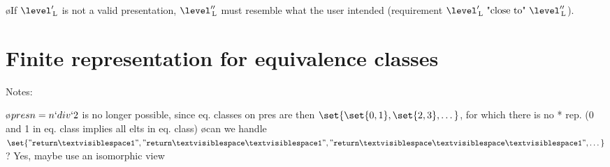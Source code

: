 %
%
%
%
%
%
%


\bl
\o If $\level'\L$ is not a valid presentation, $\level''\L$ must resemble what the user intended (requirement $\level'\L~\text{"close to"}~\level''\L$).
\el






%																
%																
%																
\section{Finite representation for equivalence classes} \label{sect:finiteRep}

Notes:

\bl
\o $pres n = n `div` 2$ is no longer possible, since eq. classes on pres are then $\set{\set{0,1},\set{2,3}, \dots }$, for which there is no * rep. (0 and 1 in eq. class implies all elts in eq. class)
\o can we handle $\set{ {\tt "return\spc1" },{\tt "return\spc\spc1" }, {\tt "return\spc\spc\spc1" }, \dots}$? Yes, maybe use an isomorphic view 
\el 

